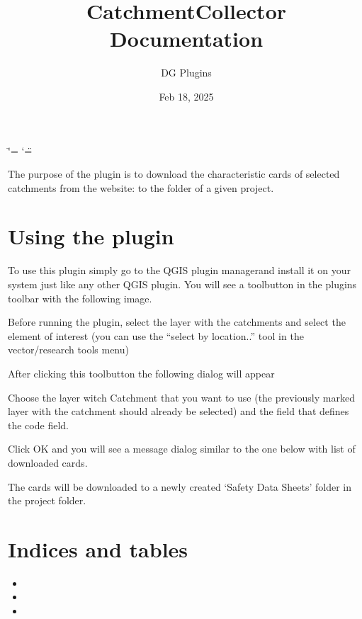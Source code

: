 \documentclass[letterpaper,10pt,english]{sphinxmanual}
\title{CatchmentCollector Documentation}
\date{Feb 18, 2025}
\author{DG Plugins}
\begin{document}
\ifdefined\shorthandoff
  \ifnum\catcode`\=\string=\active\shorthandoff{=}\fi
  \ifnum\catcode`\"=\active{}\fi
\fi

\pagestyle{empty}
\sphinxmaketitle
\pagestyle{plain}
\sphinxtableofcontents
\pagestyle{normal}
\label{\detokenize{index::doc}}


\sphinxAtStartPar
The purpose of the plugin is to download the characteristic cards of selected catchments from the website:  to the folder of a given project.


\chapter{Using the plugin}
\label{\detokenize{index:using-the-plugin}}
\sphinxAtStartPar
To use this plugin simply go to the QGIS plugin managerand install it on your system just like any other QGIS plugin.  You will see a toolbutton in the plugins toolbar with the following image.

\noindent{}

\sphinxAtStartPar
Before running the plugin, select the layer with the catchments and select the element of interest (you can use the “select by location..” tool in the vector/research tools menu)

\noindent{}

\sphinxAtStartPar
After clicking this toolbutton the following dialog will appear

\noindent{}

\sphinxAtStartPar
Choose the layer witch Catchment that you want to use (the previously marked layer with the catchment should already be selected) and the field that defines the code field.

\sphinxAtStartPar
Click OK and you will see a message dialog similar to the one below with list of downloaded cards.

\noindent{}

\sphinxAtStartPar
The cards will be downloaded to a newly created ‘Safety Data Sheets’ folder in the project folder.

\noindent{}


\chapter{Indices and tables}
\label{\detokenize{index:indices-and-tables}}\begin{itemize}
\item {} 
\sphinxAtStartPar
{}

\item {} 
\sphinxAtStartPar
{}

\item {} 
\sphinxAtStartPar
{}

\end{itemize}



\renewcommand{\indexname}{Index}
\printindex
\end{document}
